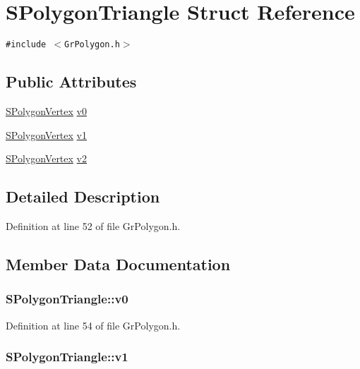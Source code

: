 \hypertarget{struct_s_polygon_triangle}{
\section{SPolygonTriangle Struct Reference}
\label{struct_s_polygon_triangle}
}
{\tt \#include $<$GrPolygon.h$>$}

\subsection*{Public Attributes}
\begin{CompactItemize}
\item 
\hyperlink{struct_s_polygon_vertex}{SPolygonVertex} \hyperlink{struct_s_polygon_triangle_74ea9711c67df3966cea22e829359ed3}{v0}
\item 
\hyperlink{struct_s_polygon_vertex}{SPolygonVertex} \hyperlink{struct_s_polygon_triangle_34c326dfc9a4ef99519522a77f82e7e8}{v1}
\item 
\hyperlink{struct_s_polygon_vertex}{SPolygonVertex} \hyperlink{struct_s_polygon_triangle_be81bfc0cd18a6e7e6637073112c6793}{v2}
\end{CompactItemize}


\subsection{Detailed Description}


Definition at line 52 of file GrPolygon.h.

\subsection{Member Data Documentation}
\hypertarget{struct_s_polygon_triangle_74ea9711c67df3966cea22e829359ed3}{
\subsubsection[{v0}]{ {\bf SPolygonTriangle::v0}}}
\label{struct_s_polygon_triangle_74ea9711c67df3966cea22e829359ed3}




Definition at line 54 of file GrPolygon.h.\hypertarget{struct_s_polygon_triangle_34c326dfc9a4ef99519522a77f82e7e8}{
\subsubsection[{v1}]{ {\bf SPolygonTriangle::v1}}}
\label{struct_s_polygon_triangle_34c326dfc9a4ef99519522a77f82e7e8}




